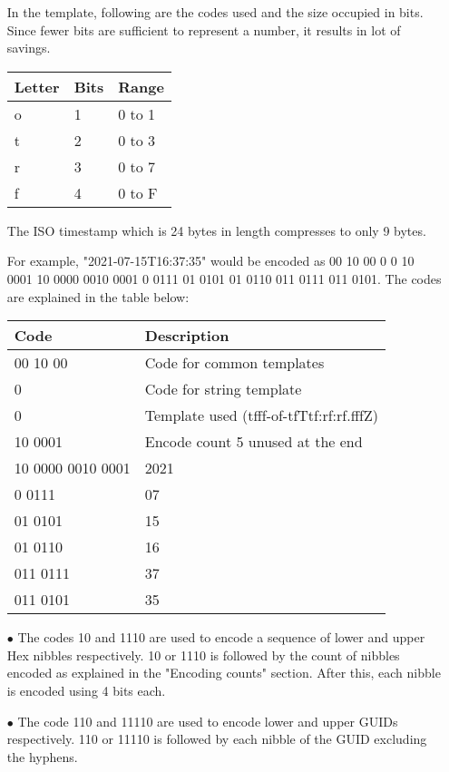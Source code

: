 \documentclass[]{article}
\begin{document}
\begin{itemize}
	\item[]In the template, following are the codes used and the size occupied in bits. Since fewer bits are sufficient to represent a number, it results in lot of savings.
	\item[]\begin{tabular}{ | l | l | l |} \hline
			\textbf{Letter} & \textbf{Bits} & \textbf{Range} \\ \hline
			o & 1 & 0 to 1 \\ \hline
			t & 2 & 0 to 3 \\ \hline
			r & 3 & 0 to 7 \\ \hline
			f & 4 & 0 to F \\ \hline
		\end{tabular}
	\item[]The ISO timestamp which is 24 bytes in length compresses to only 9 bytes.
	\item[]For example, "2021-07-15T16:37:35" would be encoded as 00 10 00 0 0 10 0001 10 0000 0010 0001 0 0111 01 0101 01 0110 011 0111 011 0101.  The codes are explained in the table below:
	\item[]\begin{tabular}{ | l | l |} \hline
		\textbf{Code} & \textbf{Description} \\ \hline
		00 10 00 & Code for common templates \\ \hline
		0 & Code for string template \\ \hline
		0 & Template used (tfff-of-tfTtf:rf:rf.fffZ) \\ \hline
		10 0001 & Encode count 5 unused at the end \\ \hline
		10 0000 0010 0001 & 2021 \\ \hline
		0 0111 & 07 \\ \hline
		01 0101 & 15 \\ \hline
		01 0110 & 16 \\ \hline
		011 0111 & 37 \\ \hline
		011 0101 & 35 \\ \hline
		\end{tabular}
	\item[$\bullet$]The codes 10 and 1110 are used to encode a sequence of lower and upper Hex nibbles respectively.  10 or 1110 is followed by the count of nibbles encoded as explained in the "Encoding counts" section.  After this, each nibble is encoded using 4 bits each.
	\item[$\bullet$]The code 110 and 11110 are used to encode lower and upper GUIDs respectively.  110 or 11110 is followed by each nibble of the GUID excluding the hyphens.

\end{itemize}
\end{document}
